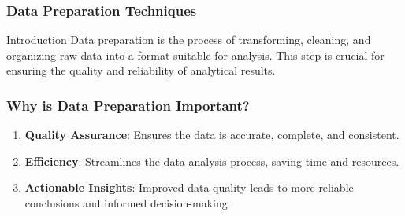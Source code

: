 \documentclass[aspectratio=169]{beamer}
\begin{document}
\begin{frame}[fragile]
    \frametitle{Data Preparation Techniques}
    \begin{block}{Introduction}
        Data preparation is the process of transforming, cleaning, and organizing raw data into a format suitable for analysis. 
        This step is crucial for ensuring the quality and reliability of analytical results.
    \end{block}
\end{frame}

\begin{frame}[fragile]
    \frametitle{Why is Data Preparation Important?}
    \begin{enumerate}
        \item \textbf{Quality Assurance}: Ensures the data is accurate, complete, and consistent.
        \item \textbf{Efficiency}: Streamlines the data analysis process, saving time and resources.
        \item \textbf{Actionable Insights}: Improved data quality leads to more reliable conclusions and informed decision-making.
    \end{enumerate}
\end{frame}
\end{document}
